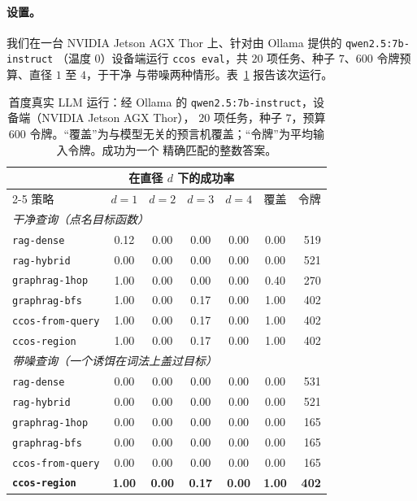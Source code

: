 \documentclass[11pt]{ctexart}
\newcommand{\code}[1]{\texttt{#1}}
\begin{document}
\paragraph{设置。} 我们在一台 NVIDIA Jetson AGX Thor 上、针对由 Ollama 提供的 \code{qwen2.5:7b-instruct}
（温度 $0$）设备端运行 \code{ccos eval}，共 $20$ 项任务、种子 $7$、$600$ 令牌预算、直径 $1$ 至 $4$，于干净
与带噪两种情形。表~\ref{tab:real} 报告该次运行。

\begin{table}[h]
\centering
\begin{tabular}{lcccccr}
\toprule
& \multicolumn{4}{c}{在直径 $d$ 下的成功率} & & \\
\cmidrule(lr){2-5}
策略 & $d{=}1$ & $d{=}2$ & $d{=}3$ & $d{=}4$ & 覆盖 & 令牌 \\
\midrule
\multicolumn{7}{l}{\emph{干净查询（点名目标函数）}}\\
\code{rag-dense}      & 0.12 & 0.00 & 0.00 & 0.00 & 0.00 & 519 \\
\code{rag-hybrid}     & 0.00 & 0.00 & 0.00 & 0.00 & 0.00 & 521 \\
\code{graphrag-1hop}  & 1.00 & 0.00 & 0.00 & 0.00 & 0.40 & 270 \\
\code{graphrag-bfs}   & 1.00 & 0.00 & 0.17 & 0.00 & 1.00 & 402 \\
\code{ccos-from-query}& 1.00 & 0.00 & 0.17 & 0.00 & 1.00 & 402 \\
\code{ccos-region}    & 1.00 & 0.00 & 0.17 & 0.00 & 1.00 & 402 \\
\midrule
\multicolumn{7}{l}{\emph{带噪查询（一个诱饵在词法上盖过目标）}}\\
\code{rag-dense}      & 0.00 & 0.00 & 0.00 & 0.00 & 0.00 & 531 \\
\code{rag-hybrid}     & 0.00 & 0.00 & 0.00 & 0.00 & 0.00 & 521 \\
\code{graphrag-1hop}  & 0.00 & 0.00 & 0.00 & 0.00 & 0.00 & 165 \\
\code{graphrag-bfs}   & 0.00 & 0.00 & 0.00 & 0.00 & 0.00 & 165 \\
\code{ccos-from-query}& 0.00 & 0.00 & 0.00 & 0.00 & 0.00 & 165 \\
\textbf{\code{ccos-region}} & \textbf{1.00} & \textbf{0.00} & \textbf{0.17} & \textbf{0.00} & \textbf{1.00} & \textbf{402} \\
\bottomrule
\end{tabular}
\caption{首度真实 LLM 运行：经 Ollama 的 \code{qwen2.5:7b-instruct}，设备端（NVIDIA Jetson AGX Thor），
$20$ 项任务，种子 $7$，预算 $600$ 令牌。“覆盖”为与模型无关的预言机覆盖；“令牌”为平均输入令牌。成功为一个
精确匹配的整数答案。}
\label{tab:real}
\end{table}
\end{document}
